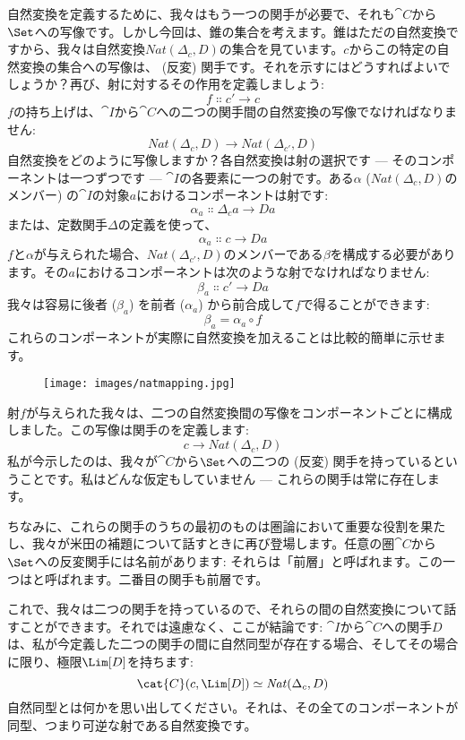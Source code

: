 \noindent
自然変換を定義するために、我々はもう一つの関手が必要で、それも$\cat{C}$から$\Set$への写像です。しかし今回は、錐の集合を考えます。錐はただの自然変換ですから、我々は自然変換$\mathit{Nat}(\Delta_c, D)$の集合を見ています。$c$からこの特定の自然変換の集合への写像は、 (反変) 関手です。それを示すにはどうすればよいでしょうか？再び、射に対するその作用を定義しましょう: 
\[f \Colon c' \to c\]
$f$の持ち上げは、$\cat{I}$から$\cat{C}$への二つの関手間の自然変換の写像でなければなりません: 
\[\mathit{Nat}(\Delta_c, D) \to \mathit{Nat}(\Delta_{c'}, D)\]
自然変換をどのように写像しますか？各自然変換は射の選択です --- そのコンポーネントは一つずつです --- $\cat{I}$の各要素に一つの射です。ある$\alpha$ ($\mathit{Nat}(\Delta_c, D)$のメンバー) の$\cat{I}$の対象$a$におけるコンポーネントは射です: 
\[\alpha_a \Colon \Delta_c a \to D a\]
または、定数関手$\Delta$の定義を使って、
\[\alpha_a \Colon c \to D a\]
$f$と$\alpha$が与えられた場合、$\mathit{Nat}(\Delta_{c'}, D)$のメンバーである$\beta$を構成する必要があります。その$a$におけるコンポーネントは次のような射でなければなりません: 
\[\beta_a \Colon c' \to D a\]
我々は容易に後者 ($\beta_a$) を前者 ($\alpha_a$) から前合成して$f$で得ることができます: 
\[\beta_a = \alpha_a \circ f\]
これらのコンポーネントが実際に自然変換を加えることは比較的簡単に示せます。

\begin{figure}[H]
  \centering
  \texttt{[image: images/natmapping.jpg]}
\end{figure}

\noindent
射$f$が与えられた我々は、二つの自然変換間の写像をコンポーネントごとに構成しました。この写像は関手のを定義します: 
\[c \to \mathit{Nat}(\Delta_c, D)\]
私が今示したのは、我々が$\cat{C}$から$\Set$への二つの (反変) 関手を持っているということです。私はどんな仮定もしていません --- これらの関手は常に存在します。

ちなみに、これらの関手のうちの最初のものは圏論において重要な役割を果たし、我々が米田の補題について話すときに再び登場します。任意の圏$\cat{C}$から$\Set$への反変関手には名前があります: それらは「前層」と呼ばれます。この一つはと呼ばれます。二番目の関手も前層です。

これで、我々は二つの関手を持っているので、それらの間の自然変換について話すことができます。それでは遠慮なく、ここが結論です: $\cat{I}$から$\cat{C}$への関手$D$は、私が今定義した二つの関手の間に自然同型が存在する場合、そしてその場合に限り、極限$\Lim[D]$を持ちます: 
\[\cat{C}(c, \Lim[D]) \simeq \mathit{Nat}(\Delta_c, D)\]
自然同型とは何かを思い出してください。それは、その全てのコンポーネントが同型、つまり可逆な射である自然変換です。

